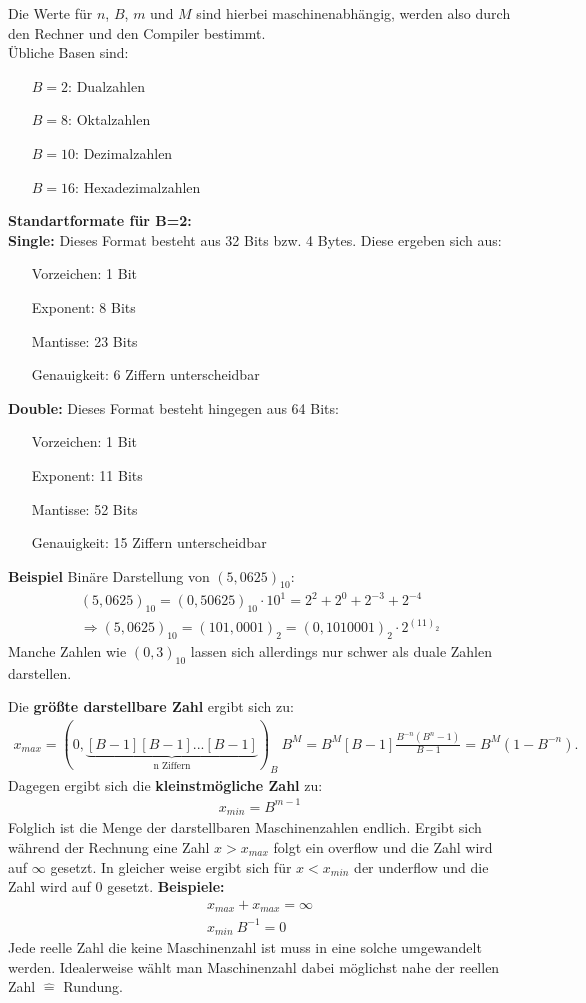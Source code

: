 \documentclass{scrartcl}
\begin{document}
Die Werte für $n$, $B$, $m$ und $M$ sind hierbei maschinenabhängig, werden also durch den Rechner und den Compiler bestimmt. \\
Übliche Basen sind:
\begin{itemize}
\item[$B=2$:] Dualzahlen
\item[$B=8$:] Oktalzahlen
\item[$B=10$:] Dezimalzahlen
\item[$B=16$:] Hexadezimalzahlen
\end{itemize}
\textbf{Standartformate für B=2:}\\
\textbf{Single:}
Dieses Format besteht aus 32 Bits bzw. 4 Bytes.
Diese ergeben sich aus:
\begin{itemize}
\item[Vorzeichen:] 1 Bit
\item[Exponent:] 8 Bits
\item[Mantisse:] 23 Bits
\item[Genauigkeit:] 6 Ziffern unterscheidbar
\end{itemize}
\textbf{Double:}
Dieses Format besteht hingegen aus 64 Bits:
\begin{itemize}
\item[Vorzeichen:] 1 Bit
\item[Exponent:] 11 Bits
\item[Mantisse:] 52 Bits
\item[Genauigkeit:] 15 Ziffern unterscheidbar
\end{itemize}
\textbf{Beispiel}
Binäre Darstellung von $(5,0625)_{10}$:
\begin{align*}
(5,0625)_{10}=(0,50625)_{10} \cdot 10^1=2^2+2^0+2^{-3}+2^{-4}\\
\Rightarrow (5,0625)_{10}=(101,0001)_2=(0,1010001)_2 \cdot 2^{(11)_2}
\end{align*}
Manche Zahlen wie $(0,3)_{10}$ lassen sich allerdings nur schwer als duale Zahlen darstellen.

Die \textbf{größte darstellbare Zahl} ergibt sich zu:
\begin{align*}
x_{max}=(0,\underbrace{[B-1] [B-1] ... [B-1]}_\text{n Ziffern})_B \ B^M=B^M[B-1]\frac{B^{-n}(B^n-1)}{B-1}=B^M(1-B^{-n}).
\end{align*}
Dagegen ergibt sich die \textbf{kleinstmögliche Zahl} zu:
\begin{align*}
x_{min}=B^{m-1}
\end{align*}
Folglich ist die Menge der darstellbaren Maschinenzahlen endlich.
Ergibt sich während der Rechnung eine Zahl $x>x_{max}$ folgt ein overflow und die Zahl wird auf $\infty$ gesetzt.
In gleicher weise ergibt sich für $x<x_{min}$ der underflow und die Zahl wird auf 0 gesetzt.
\textbf{Beispiele:}
\begin{align}
x_{max}+x_{max}=\infty \\
x_{min} \ B^{-1}=0
\end{align}
Jede reelle Zahl die keine Maschinenzahl ist muss in eine solche umgewandelt werden. Idealerweise wählt man Maschinenzahl dabei möglichst nahe der reellen Zahl $\hat{=}$ Rundung.
\end{document}
